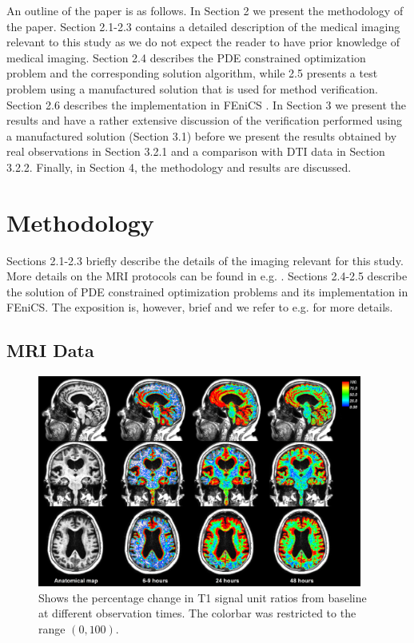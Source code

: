 \documentclass[12pt,a4paper]{article}
\begin{document}
An outline of the paper is as follows. 
In Section 2 we present the methodology of the paper. Section 2.1-2.3 contains a detailed description of the medical imaging 
relevant to this study as we do not expect the reader to have prior knowledge of medical imaging. Section 2.4
describes the PDE constrained optimization problem and the corresponding solution algorithm, while 2.5 presents
a test problem using a manufactured solution that is used for method verification. Section 2.6 describes the implementation 
in FEniCS \cite{LoggMardalEtAl2012a}. In Section 3 we present the results and have a rather extensive discussion of the verification performed
using a manufactured solution (Section 3.1) before we present the results obtained by real observations in Section 3.2.1    
and a comparison with DTI data in Section 3.2.2. Finally, in Section 4, the methodology and results are discussed.  
   
\section{Methodology}

Sections 2.1-2.3 briefly describe the details of the imaging relevant for this study. More details on the MRI protocols can be
found in e.g. \cite{ringstad2018brain}. Sections 2.4-2.5 describe the solution of PDE constrained optimization problems and
its implementation in FEniCS. The exposition is, however, brief and we refer to e.g. \cite{hinze2008optimization} for more details. 



\subsection{MRI Data}
\begin{figure}
\includegraphics[width=0.95\textwidth]{PatID-68-new-100.png} 
\caption{Shows the percentage change in T1 signal unit ratios from baseline at different observation times. The colorbar was restricted to the range $(0,100)$. }
\label{fig1} 
\end{figure}
\end{document}
